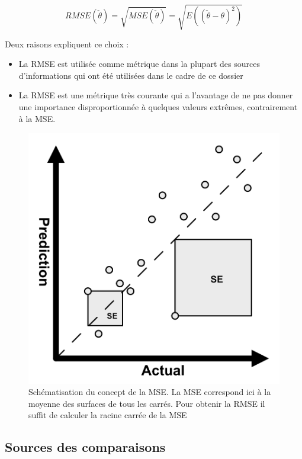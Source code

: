 \documentclass[french]{article}
\begin{document}
    \begin{equation}RMSE(\check{\theta}) =  \sqrt{MSE(\check{\theta})} = \sqrt{E((\check{\theta} - \theta)^2)}\end{equation}

    Deux raisons expliquent ce choix :
    \begin{itemize}
        \item La RMSE est utilisée comme métrique dans la plupart des sources d'informations qui ont été utilisées dans le cadre de ce dossier
        \item La RMSE est une métrique très courante qui a l'avantage de ne pas donner une importance disproportionnée à quelques valeurs extrêmes, contrairement à la MSE.
    \end{itemize}

    \begin{figure}[h!]
        \includegraphics[width=12cm]{mse}
        \centering
        \caption{Schématisation du concept de la MSE. La MSE correspond ici à la moyenne des surfaces de tous les carrés. Pour obtenir la RMSE il suffit de calculer la racine carrée de la MSE}
        \centering
    \end{figure}

    \subsection{Sources des comparaisons}
\end{document}
